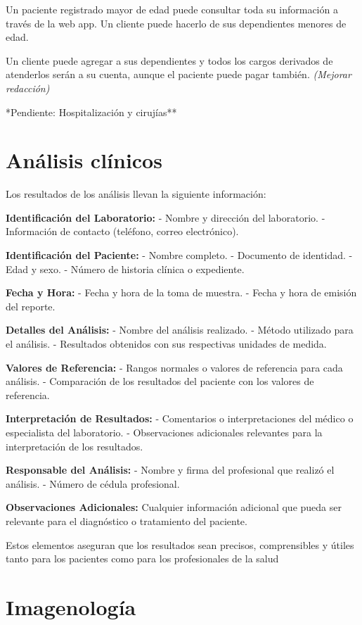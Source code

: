 \documentclass[
  letterpaper,
  DIV=11,
  numbers=noendperiod]{scrreprt}
\begin{document}
Un paciente registrado mayor de edad puede consultar toda su información
a través de la web app. Un cliente puede hacerlo de sus dependientes
menores de edad.

Un cliente puede agregar a sus dependientes y todos los cargos derivados
de atenderlos serán a su cuenta, aunque el paciente puede pagar también.
\emph{(Mejorar redacción)}

*Pendiente: Hospitalización y cirujías**

\section{Análisis clínicos}\label{anuxe1lisis-cluxednicos}

Los resultados de los análisis llevan la siguiente información:

\textbf{Identificación del Laboratorio:} - Nombre y dirección del
laboratorio. - Información de contacto (teléfono, correo electrónico).

\textbf{Identificación del Paciente:} - Nombre completo. - Documento de
identidad. - Edad y sexo. - Número de historia clínica o expediente.

\textbf{Fecha y Hora:} - Fecha y hora de la toma de muestra. - Fecha y
hora de emisión del reporte.

\textbf{Detalles del Análisis:} - Nombre del análisis realizado. -
Método utilizado para el análisis. - Resultados obtenidos con sus
respectivas unidades de medida.

\textbf{Valores de Referencia:} - Rangos normales o valores de
referencia para cada análisis. - Comparación de los resultados del
paciente con los valores de referencia.

\textbf{Interpretación de Resultados:} - Comentarios o interpretaciones
del médico o especialista del laboratorio. - Observaciones adicionales
relevantes para la interpretación de los resultados.

\textbf{Responsable del Análisis:} - Nombre y firma del profesional que
realizó el análisis. - Número de cédula profesional.

\textbf{Observaciones Adicionales:} Cualquier información adicional que
pueda ser relevante para el diagnóstico o tratamiento del paciente.

Estos elementos aseguran que los resultados sean precisos, comprensibles
y útiles tanto para los pacientes como para los profesionales de la
salud

\section{Imagenología}\label{imagenologuxeda}
\end{document}
